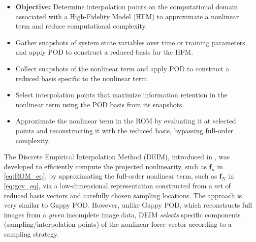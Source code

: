 \documentclass[11pt]{article}
\renewcommand{\vec}[1]{\mathbf{#1}}
\begin{document}
        \noindent\hrulefill
        \begin{itemize}
                \item {\bfseries Objective:} Determine interpolation points on the computational domain associated with a High-Fidelity Model (HFM) to approximate a nonlinear term and reduce computational complexity.
                \item Gather snapshots of system state variables over time or training parameters and apply POD to construct a reduced basis for the HFM.
                \item Collect snapshots of the nonlinear term and apply POD  to construct a reduced basis specific to the nonlinear term.
                \item Select interpolation points that maximize information retention in the nonlinear term using the POD basis from its snapshots.
                \item Approximate the nonlinear term in the ROM by evaluating it at selected points and reconstructing it with the reduced basis, bypassing full-order complexity.
        \end{itemize}
        \noindent\hrulefill




        The Discrete Empirical Interpolation Method (DEIM), introduced in \cite{chaturantabut2010nonlinear}, was developed to efficiently compute the projected nonlinearity, such as $\vec{f}_n$ in \cref{eq:ROM_eq}, by approximating the full-order nonlinear term, such as $\vec{f}_N$ in \cref{eq:gov_eq}, via a low-dimensional representation constructed from a set of reduced basis vectors and carefully chosen sampling locations.
        The approach is very similar to Gappy POD.
        However, unlike Gappy POD, which reconstructs full images from a \textit{given} incomplete image data, DEIM \textit{selects} specific components (sampling/interpolation points) of the nonlinear force vector according to a sampling strategy.
\end{document}
